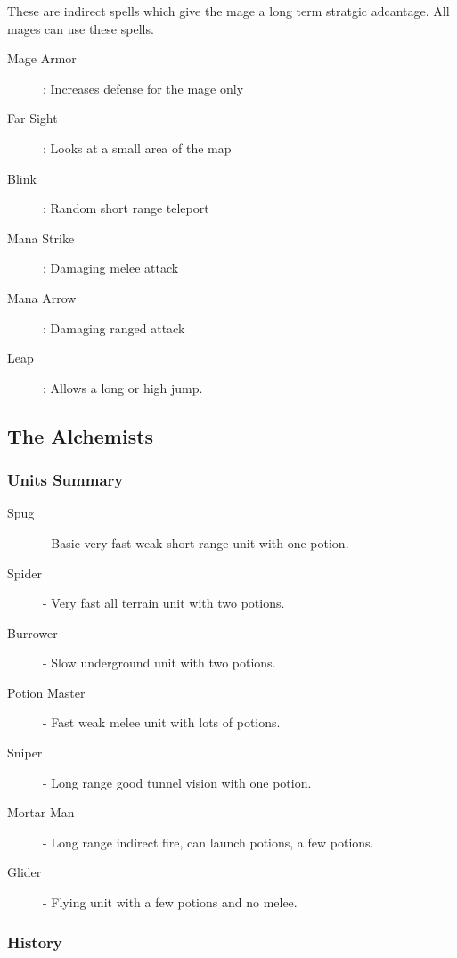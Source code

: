 \documentclass[a4paper,twocolumn]{article}
\begin{document}
These are indirect spells which give the mage a long term stratgic adcantage. All mages can use these spells.
 
\begin{description}
\item[Mage Armor] : Increases defense for the mage only
\item[Far Sight] : Looks at a small area of the map
\item[Blink] : Random short range teleport
\item[Mana Strike] : Damaging melee attack
\item[Mana Arrow] : Damaging ranged attack
\item[Leap] : Allows a long or high jump.
\end{description}

\subsection{The Alchemists}

\subsubsection{Units Summary}

\begin{description}
\item[Spug] - Basic very fast weak short range unit with one potion.
\item[Spider] - Very fast all terrain unit with two potions.
\item[Burrower] - Slow underground unit with two potions.
\item[Potion Master] - Fast weak melee unit with lots of potions.
\item[Sniper] - Long range good tunnel vision with one potion.
\item[Mortar Man] - Long range indirect fire, can launch potions, a few potions.
\item[Glider] - Flying unit with a few potions and no melee.
\end{description}

\subsubsection{History}
\end{document}
